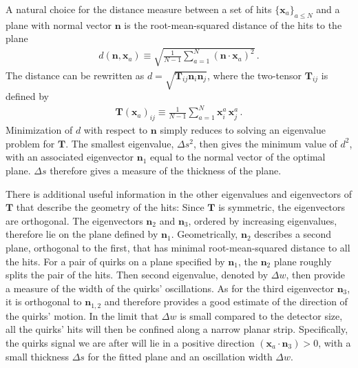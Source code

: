 \documentclass[10pt,aps,prd,nofootinbib,superscriptaddress,twocolumn,preprintnumbers,balancelastpage]{revtex4}
\newcommand{\TL}[1]{\textcolor{Purple}{\bf TL: #1}}
\begin{document}
A natural choice for the distance measure between a set of hits $\{{\bm x}_a\}_{a\le N}$ and a plane with normal vector ${\bm n}$ is the root-mean-squared distance of the hits to the plane
\begin{align}
  d({\bm n},  {\bm x}_a)\equiv \sqrt{\frac{1}{N-1}\sum^N_{a=1} \left({\bm n}\cdot {\bm x}_a\right)^2}\,.
\label{eq:track_dist}
\end{align}
The distance can be rewritten as $d= \sqrt{{\bm T}_{ij}{\bm n}_i{\bm n}_j}$, where the two-tensor ${\bm T}_{ij}$ is defined by
\begin{align}
  {\bm T}({\bm x}_a)_{ij} \equiv \frac{1}{N-1}\sum_{a=1}^N {\bm x}^a_{i} \,{\bm x}^a_{j}\,.
\label{eq:track_tensor}
\end{align}
Minimization of $d$ with respect to $\bm n$ simply reduces to solving an eigenvalue problem for $\bm T$. The smallest eigenvalue, $\Delta s^2$, then gives the minimum value of $d^2$, with an associated eigenvector ${\bm n}_1$ equal to the normal vector of the optimal plane. $\Delta s$ therefore gives a measure of the thickness of the plane.

There is additional useful information in the other eigenvalues and eigenvectors of ${\bm T}$ that describe the geometry of the hits: Since ${\bm T}$ is symmetric, the eigenvectors are orthogonal. The eigenvectors ${\bm n}_2$ and ${\bm n}_3$, ordered by increasing eigenvalues, therefore lie on the plane defined by ${\bm n}_1$. Geometrically, ${\bm n}_2$ describes a second plane, orthogonal to the first, that has minimal root-mean-squared distance to all the hits. For a pair of quirks on a plane specified by ${\bm n}_1$, the ${\bm n}_2$ plane roughly splits the pair of the hits. Then second eigenvalue, denoted by $\Delta w$, then provide a measure of the width of the quirks' oscillations. As for the third eigenvector ${\bm n}_3$, it is orthogonal to ${\bm n}_{1,2}$ and therefore provides a good estimate of the direction of the quirks' motion. In the limit that $\Delta w$ is small compared to the detector size, all the quirks' hits will then be confined along a narrow planar strip. Specifically, the quirks signal we are after will lie in a positive direction $({\bm x}_a \cdot{\bm n}_3 ) >0$, with a small thickness $\Delta s$ for the fitted plane and an oscillation width $\Delta w$. 

\end{document}
